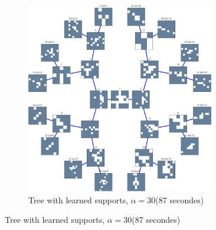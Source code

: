 \begin{figure}[!h]
\begin{subfigure}[b]{0.49\textwidth}
\includegraphics[width=0.9\textwidth]{figures/tree-learn/gradient-vs-sequential/xp_learnsupp256_curvelet_decomp3_tree-binary_dpth4_supp-diracs_usegrad1_every5_add5_totinit0_totadd279_alpha30_tree.pdf} 
	\caption{Tree with learned supports, $\alpha=30$(87 secondes)}
\end{subfigure}
\end{figure}
